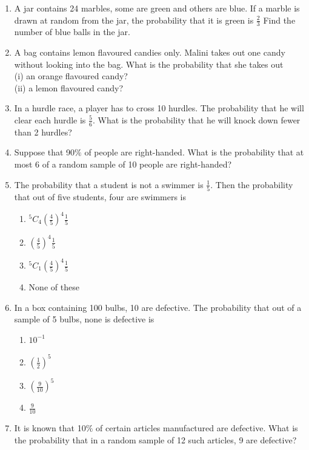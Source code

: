 \renewcommand{\theequation}{\theenumi}
\begin{enumerate}[label=\thesection.\arabic*.,ref=\thesection.\theenumi]


\item A jar contains 24 marbles, some are green and others are blue. If a marble is drawn at random from the jar, the probability that it is green is $\frac{2}{3}$ Find the number of blue balls in the jar.
\item A bag contains lemon flavoured candies only. Malini takes out one candy without
looking into the bag. What is the probability that she takes out\\
(i) an orange flavoured candy?\\
(ii) a lemon flavoured candy?
\item In a hurdle race, a player has to cross 10 hurdles. The probability that he will
clear each hurdle is $\frac{5}{6}$. What is the probability that he will knock down fewer than 2 hurdles?\\
\solution 

\item Suppose that 90$\%$ of people are right-handed. What is the probability that
at most 6 of a random sample of 10 people are right-handed?\\
\item The probability that a student is not a swimmer is $\frac{1}{5}$. Then the probability that out of five students, four are swimmers is\\
\begin{enumerate}
\item $^5C_4 (\frac{4}{5})^4 \frac{1}{5}$
\item $(\frac{4}{5})^4 \frac{1}{5}$
\item $^5C_1 (\frac{4}{5})^4 \frac{1}{5}$
\item None of these
\end{enumerate}
\item In a box containing 100 bulbs, 10 are defective. The probability that out of a
sample of 5 bulbs, none is defective is
\begin{enumerate}
\item $10^{-1}$
\item $(\frac{1}{2})^5$
\item $(\frac{9}{10})^5$
\item $\frac{9}{10}$
\end{enumerate}
\item It is known that 10$\%$ of certain articles manufactured are defective. What is the probability that in a random sample of 12 such articles, 9 are defective?\\

\end{enumerate}
